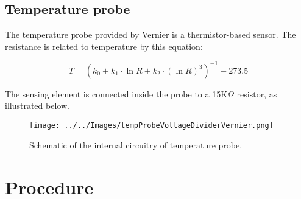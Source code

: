 \documentclass[12pt,oneside]{article}
\begin{document}
\subsection{Temperature probe}
The temperature probe provided by Vernier is a thermistor-based sensor. The resistance is related to temperature by this equation:

\begin{equation*}
T = (k_0 + k_1\cdot\ln{R} + k_2\cdot(\ln{R})^3)^{-1} - 273.5
\end{equation*}

 The sensing element is connected inside the probe to a 15K$\Omega$ resistor, as illustrated below.  
\begin{figure}[h!]
\centering
  \texttt{[image: ../../Images/tempProbeVoltageDividerVernier.png]}\label{}\caption{Schematic of the internal circuitry of temperature probe.}
\end{figure}

\section{Procedure}
\end{document}
